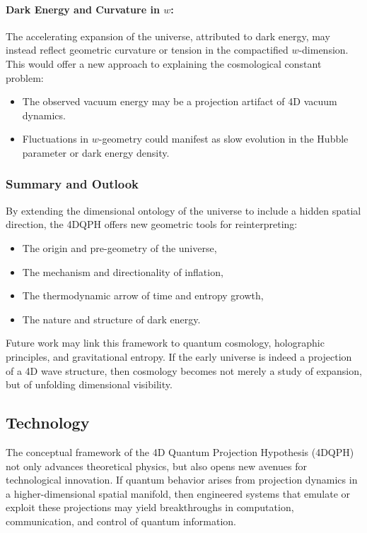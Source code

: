 \documentclass[12pt]{article}
\begin{document}
\paragraph{Dark Energy and Curvature in \( w \):}
The accelerating expansion of the universe, attributed to dark energy, may instead reflect geometric curvature or tension in the compactified \( w \)-dimension. This would offer a new approach to explaining the cosmological constant problem:
\begin{itemize}
    \item The observed vacuum energy may be a projection artifact of 4D vacuum dynamics.
    \item Fluctuations in \( w \)-geometry could manifest as slow evolution in the Hubble parameter or dark energy density.
\end{itemize}

\subsubsection*{Summary and Outlook}

By extending the dimensional ontology of the universe to include a hidden spatial direction, the 4DQPH offers new geometric tools for reinterpreting:

\begin{itemize}
    \item The origin and pre-geometry of the universe,
    \item The mechanism and directionality of inflation,
    \item The thermodynamic arrow of time and entropy growth,
    \item The nature and structure of dark energy.
\end{itemize}

Future work may link this framework to quantum cosmology, holographic principles, and gravitational entropy. If the early universe is indeed a projection of a 4D wave structure, then cosmology becomes not merely a study of expansion, but of unfolding dimensional visibility.


\subsection{Technology}

The conceptual framework of the 4D Quantum Projection Hypothesis (4DQPH) not only advances theoretical physics, but also opens new avenues for technological innovation. If quantum behavior arises from projection dynamics in a higher-dimensional spatial manifold, then engineered systems that emulate or exploit these projections may yield breakthroughs in computation, communication, and control of quantum information.
\end{document}
